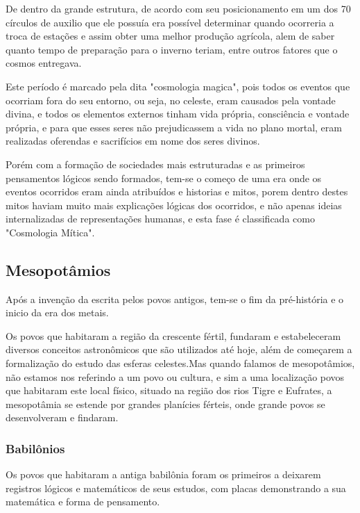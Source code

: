  De dentro da grande estrutura, de acordo com seu posicionamento em um dos 70 círculos de auxilio que ele possuía era possível determinar quando ocorreria a troca de estações e assim obter uma melhor produção agrícola, alem de saber quanto tempo de preparação para o inverno teriam, entre outros fatores que o cosmos entregava.

\begin{figure}[!h]
	\center
	\qquad
\end{figure}
Este período é marcado pela dita "cosmologia magica", pois todos os eventos que ocorriam fora do seu entorno, ou seja, no celeste, eram causados pela vontade divina, e todos os elementos externos tinham vida própria, consciência e vontade própria, e para que esses seres não prejudicassem a vida no plano mortal, eram realizadas oferendas e sacrifícios em nome dos seres divinos.

Porém com a formação de sociedades mais estruturadas e as primeiros pensamentos lógicos sendo formados, tem-se o começo de uma era onde os eventos ocorridos eram ainda atribuídos e historias e mitos, porem dentro destes mitos haviam muito mais explicações lógicas dos ocorridos, e não apenas ideias internalizadas de representações humanas, e esta fase é classificada como "Cosmologia Mítica".
\subsection*{Mesopotâmios}
Após a invenção da escrita pelos povos antigos, tem-se o fim da pré-história e o inicio da era dos metais.

Os povos que habitaram a região da crescente fértil, fundaram e estabeleceram diversos conceitos astronômicos que são utilizados até hoje, além de começarem a formalização do estudo das esferas celestes.Mas quando falamos de mesopotâmios, não estamos nos referindo a um povo ou cultura, e sim a uma localização povos que habitaram este local físico, situado na região dos rios Tigre e Eufrates, a mesopotâmia se estende por grandes planícies férteis, onde grande povos se desenvolveram e findaram.
\subsubsection*{Babilônios}
Os povos que habitaram a antiga babilônia foram os primeiros a deixarem registros lógicos e matemáticos de seus estudos, com placas demonstrando a sua matemática e forma de pensamento.

